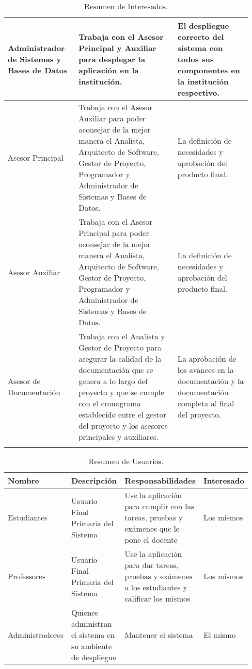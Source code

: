 \begin{longtable}{|p{}|p{}|p{}|}
  \hline
  Administrador de Sistemas y Bases de Datos & Trabaja con el Asesor Principal y Auxiliar para desplegar la aplicación en la institución. & El despliegue correcto del sistema con todos sus componentes en la institución respectivo. \\
  \hline
  Asesor Principal & Trabaja con el Asesor Auxiliar para poder aconsejar de la mejor manera el Analista, Arquitecto de Software, Gestor de Proyecto, Programador y Administrador de Sistemas y Bases de Datos. & La definición de necesidades y aprobación del producto final. \\
  \hline
  Asesor Auxiliar & Trabaja con el Asesor Principal para poder aconsejar de la mejor manera el Analista, Arquitecto de Software, Gestor de Proyecto, Programador y Administrador de Sistemas y Bases de Datos. & La definición de necesidades y aprobación del producto final. \\
  \hline
  Asesor de Documentación & Trabaja con el Analista y Gestor de Proyecto para asegurar la calidad de la documentación que se genera a lo largo del proyecto y que se cumple con el cronograma establecido entre el gestor del proyecto y los asesores principales y auxiliares. & La aprobación de los avances en la documentación y la documentación completa al final del proyecto. \\
  \hline
  \caption{Resumen de Interesados.}
  \label{res-inter}
\end{longtable}

\begin{table}[h!]
  \begin{tabular}{|p{}|p{}|p{}|p{}|}
    \hline
    \textbf{Nombre} & \textbf{Descripción} & \textbf{Responsabilidades} & \textbf{Interesado} \\
    \hline
    Estudiantes & Usuario Final Primaria del Sistema & Use la aplicación para cumplir con las tareas, pruebas y exámenes que le pone el docente & Los mismos \\
    \hline
    Professores & Usuario Final Primaria del Sistema & Use la aplicación para dar tareas, pruebas y exámenes a los estudiantes y calificar los mismos & Los mismos \\
    \hline
    Administradores & Quienes administran el sistema en su ambiente de despliegue & Mantener el sistema & El mismo \\
    \hline
  \end{tabular}
  \caption{Resumen de Usuarios.}
  \label{res-user}
\end{table}

